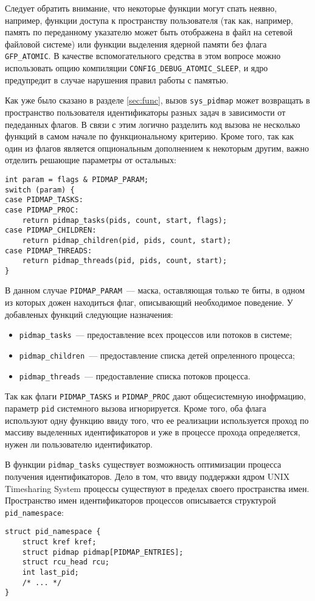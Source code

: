 Следует обратить внимание, что некоторые функции могут спать неявно, например,
функции доступа к пространству пользователя (так как, например, память по
переданному указателю может быть отображена в файл на сетевой файловой системе)
или функции выделения ядерной памяти без флага \texttt{GFP\_ATOMIC}. В качестве
вспомогательного средства в этом вопросе можно использовать опцию компиляции
\texttt{CONFIG\_DEBUG\_ATOMIC\_SLEEP}, и ядро предупредит в случае нарушения
правил работы с памятью.


Как уже было сказано в разделе \ref{sec:func}, вызов \texttt{sys\_pidmap} может
возвращать в пространство пользователя идентификаторы разных задач в зависимости
от педеданных флагов. В связи с этим логично разделить код вызова не несколько
функций в самом начале по функциональному критерию. Кроме того, так как один из
флагов является опциональным дополнением к некоторым другим, важно отделить
решающие параметры от остальных:
\medskip
\begin{lstlisting}[style=cstyle]
int param = flags & PIDMAP_PARAM;
switch (param) {
case PIDMAP_TASKS:
case PIDMAP_PROC:
	return pidmap_tasks(pids, count, start, flags);
case PIDMAP_CHILDREN:
	return pidmap_children(pid, pids, count, start);
case PIDMAP_THREADS:
	return pidmap_threads(pid, pids, count, start);
}
\end{lstlisting}
\medskip

В данном случае \texttt{PIDMAP\_PARAM}~--- маска, оставляющая только те биты, в
одном из которых дожен находиться флаг, описывающий необходимое поведение. У
добавленых функций следующие назначения:
\begin{itemize}
\item \texttt{pidmap\_tasks}~--- предоставление всех процессов или потоков в системе;
\item \texttt{pidmap\_children}~--- предоставление списка детей опреленного процесса;
\item \texttt{pidmap\_threads}~--- предоставление списка потоков процесса.
\end{itemize}

Так как флаги \texttt{PIDMAP\_TASKS} и \texttt{PIDMAP\_PROC} дают общесистемную
инофрмацию, параметр \texttt{pid} системного вызова игнорируется. Кроме того,
оба флага используют одну функцию ввиду того, что ее реализации используется
проход по массиву выделенных идентификаторов и уже в процессе прохода
определяется, нужен ли пользователю идентификатор.

В функции \texttt{pidmap\_tasks} существует возможность оптимизации процесса
получения идентификаторов. Дело в том, что ввиду поддержки ядром UNIX
Timesharing System процессы существуют в пределах своего пространства имен.
Пространство имен идентификаторов процессов описывается структурой
\texttt{pid\_namespace}:
\medskip
\begin{lstlisting}[style=cstyle]
struct pid_namespace {
	struct kref kref;
	struct pidmap pidmap[PIDMAP_ENTRIES];
	struct rcu_head rcu;
	int last_pid;
	/* ... */
}
\end{lstlisting}
\medskip

